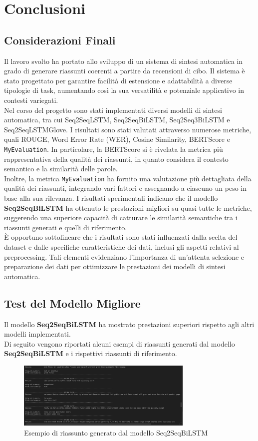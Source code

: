 \section{Conclusioni} 
\subsection{Considerazioni Finali}
Il lavoro svolto ha portato allo sviluppo di un sistema di sintesi automatica in grado di generare riassunti coerenti a partire da recensioni di cibo. Il sistema è stato progettato per garantire facilità di estensione e adattabilità a diverse tipologie di task, aumentando così la sua versatilità e potenziale applicativo in contesti variegati.\\
Nel corso del progetto sono stati implementati diversi modelli di sintesi automatica, tra cui Seq2SeqLSTM, Seq2SeqBiLSTM, Seq2Seq3BiLSTM e Seq2SeqLSTMGlove. 
I risultati sono stati valutati attraverso numerose metriche, quali ROUGE, Word Error Rate (WER), Cosine Similarity, BERTScore e \texttt{MyEvaluation}. In particolare, 
la BERTScore si è rivelata la metrica più rappresentativa della qualità dei riassunti, in quanto considera il contesto semantico e la similarità delle parole.\\

Inoltre, la metrica \texttt{MyEvaluation} ha fornito una valutazione più dettagliata della qualità dei riassunti, integrando vari fattori e assegnando a ciascuno 
un peso in base alla sua rilevanza. I risultati sperimentali indicano che il modello \textbf{Seq2SeqBiLSTM} ha ottenuto le prestazioni migliori su quasi tutte le metriche, 
suggerendo una superiore capacità di catturare le similarità semantiche tra i riassunti generati e quelli di riferimento.\\

È opportuno sottolineare che i risultati sono stati influenzati dalla scelta del dataset e dalle specifiche caratteristiche dei dati, 
inclusi gli aspetti relativi al preprocessing. Tali elementi evidenziano l'importanza di un'attenta selezione e preparazione dei dati per 
ottimizzare le prestazioni dei modelli di sintesi automatica.

\subsection{Test del Modello Migliore}
Il modello \textbf{Seq2SeqBiLSTM} ha mostrato prestazioni superiori rispetto agli altri modelli implementati.\\
Di seguito vengono riportati alcuni esempi di riassunti generati dal modello \textbf{Seq2SeqBiLSTM} e i rispettivi riassunti di riferimento.\\

\begin{figure}[H]
    \centering
    \includegraphics[width=0.75\textwidth]{media/Seq2SeqBiLSTM_inference.png}
    \caption{Esempio di riassunto generato dal modello Seq2SeqBiLSTM}
    \label{fig:example1}
\end{figure}